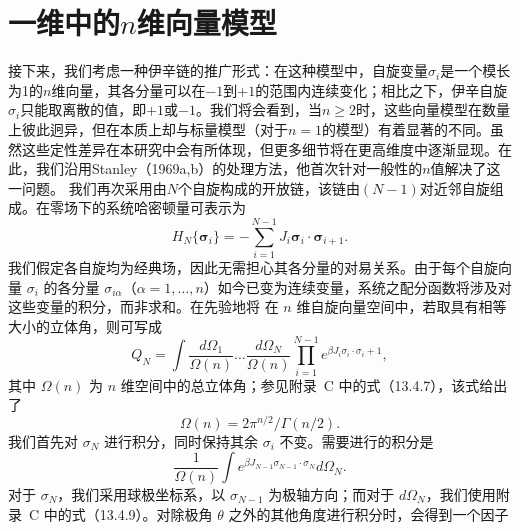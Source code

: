 \section{\texorpdfstring{一维中的\(n\)维向量模型}{一维中的n维向量模型}}\label{ux4e00ux7ef4ux4e2dux7684nux7ef4ux5411ux91cfux6a21ux578b}
接下来，我们考虑一种伊辛链的推广形式：在这种模型中，自旋变量\(\sigma_{i}\)是一个模长为1的\(n\)维向量，其各分量可以在\(-1\)到\(+1\)的范围内连续变化；相比之下，伊辛自旋\(\sigma_{i}\)只能取离散的值，即\(+1\)或\(-1\)。我们将会看到，当\(n \geq 2\)时，这些向量模型在数量上彼此迥异，但在本质上却与标量模型（对于\(n=1\)的模型）有着显著的不同。虽然这些定性差异在本研究中会有所体现，但更多细节将在更高维度中逐渐显现。在此，我们沿用Stanley（1969a,b）的处理方法，他首次针对一般性的\(n\)值解决了这一问题。
我们再次采用由\(N\)个自旋构成的开放链，该链由\((N-1)\)对近邻自旋组成。在零场下的系统哈密顿量可表示为
\begin{equation}\tag{13.1.52}\label{eq:13.1.52}
H _ { N } \{ \pmb { \sigma } _ { i } \} = - \sum _ { i = 1 } ^{N - 1} J _ { i } \pmb { \sigma } _ { i } \cdot \pmb { \sigma } _ { i + 1 } .
\end{equation}
我们假定各自旋均为经典场，因此无需担心其各分量的对易关系。由于每个自旋向量 \(\sigma_{i}\) 的各分量 \(\sigma_{i\alpha}\)（\(\alpha=1,\ldots,n\)）如今已变为连续变量，系统之配分函数将涉及对这些变量的积分，而非求和。在先验地将
在 \(n\) 维自旋向量空间中，若取具有相等大小的立体角，则可写成
\begin{equation}\tag{13.1.53}\label{eq:13.1.53}
Q _ { N } = \int \frac { d \Omega _ { 1 } } { \Omega ( n ) } \ldots \frac { d \Omega _ { N } } { \Omega ( n ) } \prod _ { i = 1 } ^{N - 1} e ^{\beta J _ { i} \sigma _ { i } \cdot \sigma _ { i } + 1 } ,
\end{equation}
其中 \(\Omega(n)\) 为 \(n\) 维空间中的总立体角；参见附录~C 中的式（13.4.7），该式给出了
\begin{equation}\tag{13.1.54}\label{eq:13.1.54}
\Omega ( n ) = 2 \pi ^{n / 2} / \Gamma ( n / 2 ) .
\end{equation}
我们首先对 \(\sigma_{N}\) 进行积分，同时保持其余 \(\sigma_{i}\) 不变。需要进行的积分是
\begin{equation}\tag{13.1.55}\label{eq:13.1.55}
\frac { 1 } { \Omega ( n ) } \int e ^{\beta J _ { N - 1} \sigma _ { N - 1 } \cdot \sigma _ { N } } d \Omega _ { N } .
\end{equation}
对于 \(\sigma_{N}\)，我们采用球极坐标系，以 \(\sigma_{N-1}\) 为极轴方向；而对于 \(d\Omega_{N}\)，我们使用附录~C 中的式（13.4.9）。对除极角 \(\theta\) 之外的其他角度进行积分时，会得到一个因子
